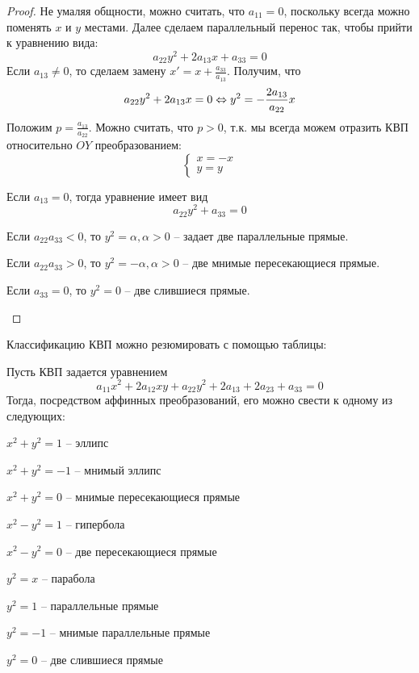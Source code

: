 \begin{proof}
	Не умаляя общности, можно считать, что $a_{11} = 0$, поскольку всегда можно поменять $x$ и $y$ местами.
	Далее сделаем параллельный перенос так, чтобы прийти к уравнению вида:
	\[a_{22} y^2 + 2a_{13} x + a_{33} = 0\]
	Если $a_{13} \neq 0$, то сделаем замену $x' = x + \frac{a_{33}}{a_{13}}$. Получим, что
	\[a_{22} y^2 + 2a_{13} x = 0 \Leftrightarrow y^2 = - \frac{2a_{13}}{a_{22}}x\]
	Положим $p = \frac{a_{13}}{a_{22}}$. Можно считать, что $p > 0$, т.к. мы всегда можем отразить КВП относительно $OY$ преобразованием:
	\[\begin{cases}
		x = -x \\
		y = y
	\end{cases}\]

	Если $a_{13} = 0$, тогда уравнение имеет вид
	\[a_{22} y^2 + a_{33} = 0\]
	\begin{MyList}
		\item Если $a_{22} a_{33} < 0$, то $y^2 = \alpha, \alpha > 0$ -- задает две параллельные прямые.
		\item Если $a_{22} a_{33} > 0$, то $y^2 = -\alpha, \alpha > 0$ -- две мнимые пересекающиеся прямые.
		\item Если $a_{33} = 0$, то $y^2 = 0$ -- две слившиеся прямые. 
	\end{MyList} 
\end{proof}

\begin{Rem}
	Классификацию КВП можно резюмировать с помощью таблицы:
	\begin{figure}[H]
		\centering
		\fontsize{6pt}{2pt}
		\def\svgwidth{.9\columnwidth}
		
	\end{figure}
\end{Rem}

\begin{Thm}
	Пусть КВП задается уравнением
	\[a_{11} x^2 + 2a_{12} xy + a_{22} y^2 + 2a_{13} + 2a_{23} + a_{33} = 0\]
	Тогда, посредством аффинных преобразований, его можно свести к одному из следующих:
	\begin{MyList}
		\item $x^2 + y^2 = 1$ -- эллипс
		\item $x^2 + y^2 = -1$ -- мнимый эллипс
		\item $x^2 + y^2 = 0$ -- мнимые пересекающиеся прямые
		\item $x^2 - y^2 = 1$ -- гипербола
		\item $x^2 - y^2 = 0$ -- две пересекающиеся прямые
		\item $y^2 = x$ -- парабола
		\item $y^2 = 1$ -- параллельные прямые
		\item $y^2 = -1$ -- мнимые параллельные прямые
		\item $y^2 = 0$ -- две слившиеся прямые
	\end{MyList}
\end{Thm}
